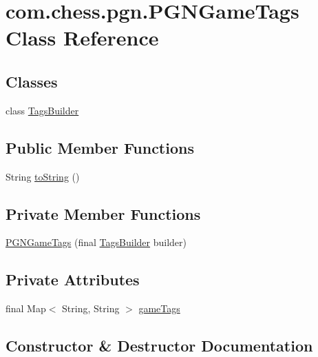 \hypertarget{classcom_1_1chess_1_1pgn_1_1_p_g_n_game_tags}{}\section{com.\+chess.\+pgn.\+P\+G\+N\+Game\+Tags Class Reference}
\label{classcom_1_1chess_1_1pgn_1_1_p_g_n_game_tags}
\subsection*{Classes}
\begin{DoxyCompactItemize}
\item 
class \mbox{\hyperlink{classcom_1_1chess_1_1pgn_1_1_p_g_n_game_tags_1_1_tags_builder}{Tags\+Builder}}
\end{DoxyCompactItemize}
\subsection*{Public Member Functions}
\begin{DoxyCompactItemize}
\item 
String \mbox{\hyperlink{classcom_1_1chess_1_1pgn_1_1_p_g_n_game_tags_ade3d9fafb7227f1ef8f49735de5341f3}{to\+String}} ()
\end{DoxyCompactItemize}
\subsection*{Private Member Functions}
\begin{DoxyCompactItemize}
\item 
\mbox{\hyperlink{classcom_1_1chess_1_1pgn_1_1_p_g_n_game_tags_ae5ba4e423648ebcca746eeb525e60da5}{P\+G\+N\+Game\+Tags}} (final \mbox{\hyperlink{classcom_1_1chess_1_1pgn_1_1_p_g_n_game_tags_1_1_tags_builder}{Tags\+Builder}} builder)
\end{DoxyCompactItemize}
\subsection*{Private Attributes}
\begin{DoxyCompactItemize}
\item 
final Map$<$ String, String $>$ \mbox{\hyperlink{classcom_1_1chess_1_1pgn_1_1_p_g_n_game_tags_aa7d57cc391d1e4910d11737834b23a04}{game\+Tags}}
\end{DoxyCompactItemize}


\subsection{Constructor \& Destructor Documentation}
\mbox{\label{classcom_1_1chess_1_1pgn_1_1_p_g_n_game_tags_ae5ba4e423648ebcca746eeb525e60da5}} 
